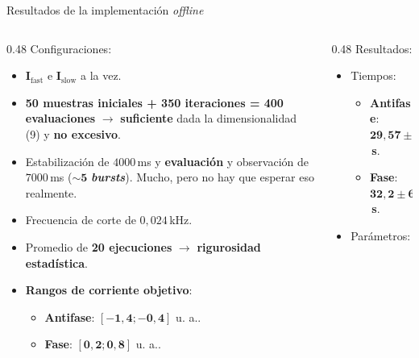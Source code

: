 \documentclass[10pt, aspectratio=169]{beamer}
\begin{document}
\begin{frame}{Resultados de la implementación \textit{offline}}
    \scriptsize
    \begin{columns}[t]
        \begin{column}{0.48\textwidth}
            Configuraciones:
            \begin{itemize}
                \item $\boldsymbol{I_{\mathrm{fast}}}$ e $\boldsymbol{I_{\mathrm{slow}}}$ a la vez.
                \item \textbf{50 muestras iniciales + 350 iteraciones = 400 evaluaciones} $\to$ \textbf{suficiente} dada la dimensionalidad (9) y \textbf{no excesivo}.
                \item Estabilización de $4000$\,ms y \textbf{evaluación} y observación de $7000$\,ms ($\boldsymbol{\sim 5}$ \textbf{\textit{bursts}}). Mucho, pero no hay que esperar eso realmente.
                \item Frecuencia de corte de $0{,}024$\,kHz.
                \item Promedio de \textbf{20 ejecuciones} $\to$ \textbf{rigurosidad estadística}.
                \item \textbf{Rangos de corriente objetivo}:
                      \begin{itemize}
                          \scriptsize
                          \item \textbf{Antifase}: $\boldsymbol{[-1{,}4; -0{,}4]}$ u. a..
                          \item \textbf{Fase}: $\boldsymbol{[0{,}2; 0{,}8]}$ u. a..
                      \end{itemize}
            \end{itemize}
        \end{column}
        \begin{column}{0.48\textwidth}
            Resultados:
            \begin{itemize}
                \item Tiempos:
                      \begin{itemize}
                          \scriptsize
                          \item \textbf{Antifase}: $\boldsymbol{29{,}57 \pm 9{,}27}$\,\textbf{s}.
                          \item \textbf{Fase}: $\boldsymbol{32{,}2 \pm 6{,}77}$\,\textbf{s}.
                      \end{itemize}
                \item Parámetros:

\end{itemize}
\end{column}
\end{columns}
\end{frame}
\end{document}
